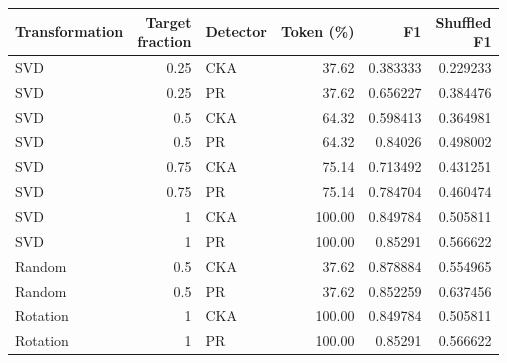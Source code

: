 \begin{center}\small
\begin{tabular}{@{}lrlrrr@{}}
\toprule
Transformation & \shortstack{Target\\fraction} & Detector & Token (\%) & F1 & \shortstack{Shuffled\\F1} \\
\midrule
SVD & 0.25 & CKA & 37.62 & 0.383333 & 0.229233 \\
SVD & 0.25 & PR & 37.62 & 0.656227 & 0.384476 \\
SVD & 0.5 & CKA & 64.32 & 0.598413 & 0.364981 \\
SVD & 0.5 & PR & 64.32 & 0.84026 & 0.498002 \\
SVD & 0.75 & CKA & 75.14 & 0.713492 & 0.431251 \\
SVD & 0.75 & PR & 75.14 & 0.784704 & 0.460474 \\
SVD & 1 & CKA & 100.00 & 0.849784 & 0.505811 \\
SVD & 1 & PR & 100.00 & 0.85291 & 0.566622 \\
Random & 0.5 & CKA & 37.62 & 0.878884 & 0.554965 \\
Random & 0.5 & PR & 37.62 & 0.852259 & 0.637456 \\
Rotation & 1 & CKA & 100.00 & 0.849784 & 0.505811 \\
Rotation & 1 & PR & 100.00 & 0.85291 & 0.566622 \\
\bottomrule
\end{tabular}
\end{center}
